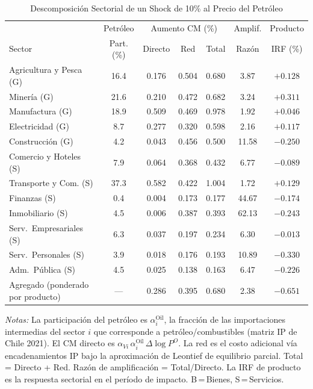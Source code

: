 \begin{table}[htbp]
\centering
\caption{Descomposición Sectorial de un Shock de 10\% al Precio del Petróleo}
\label{tab:oil_chiib0p05_decomp}
\begin{threeparttable}
\small
\begin{tabular}{@{}l c c c c c c@{}}
\toprule
 & Petróleo & \multicolumn{3}{c}{Aumento CM (\%)} & Amplif. & Producto \\
\cmidrule(lr){3-5}
Sector & Part. (\%) & Directo & Red & Total & Razón & IRF (\%) \\
\midrule
Agricultura y Pesca (G) & 16.4 & 0.176 & 0.504 & 0.680 &  3.87 & $+0.128$ \\
Minería (G) & 21.6 & 0.210 & 0.472 & 0.682 &  3.24 & $+0.311$ \\
Manufactura (G) & 18.9 & 0.509 & 0.469 & 0.978 &  1.92 & $+0.046$ \\
Electricidad (G) &  8.7 & 0.277 & 0.320 & 0.598 &  2.16 & $+0.117$ \\
Construcción (G) &  4.2 & 0.043 & 0.456 & 0.500 & 11.58 & $-0.250$ \\
Comercio y Hoteles (S) &  7.9 & 0.064 & 0.368 & 0.432 &  6.77 & $-0.089$ \\
Transporte y Com. (S) & 37.3 & 0.582 & 0.422 & 1.004 &  1.72 & $+0.129$ \\
Finanzas (S) &  0.4 & 0.004 & 0.173 & 0.177 & 44.67 & $-0.174$ \\
Inmobiliario (S) &  4.5 & 0.006 & 0.387 & 0.393 & 62.13 & $-0.243$ \\
Serv.\ Empresariales (S) &  6.3 & 0.037 & 0.197 & 0.234 &  6.30 & $-0.013$ \\
Serv.\ Personales (S) &  3.9 & 0.018 & 0.176 & 0.193 & 10.89 & $-0.330$ \\
Adm.\ Pública (S) &  4.5 & 0.025 & 0.138 & 0.163 &  6.47 & $-0.226$ \\
\midrule
Agregado (ponderado por producto) & --- & 0.286 & 0.395 & 0.680 &  2.38 & $-0.651$ \\
\bottomrule
\end{tabular}
\begin{tablenotes}[flushleft]
\footnotesize
\item \textit{Notas:} La participación del petróleo es $\alpha^{\text{Oil}}_i$, la fracción de las importaciones intermedias del sector $i$ que corresponde a petróleo/combustibles (matriz IP de Chile 2021). El CM directo es $\alpha_{Vi}\,\alpha^{\text{Oil}}_i\,\Delta\log P^O$. La red es el costo adicional vía encadenamientos IP bajo la aproximación de Leontief de equilibrio parcial. Total = Directo + Red. Razón de amplificación = Total/Directo. La IRF de producto es la respuesta sectorial en el período de impacto. B\,=\,Bienes, S\,=\,Servicios.
\end{tablenotes}
\end{threeparttable}
\end{table}
